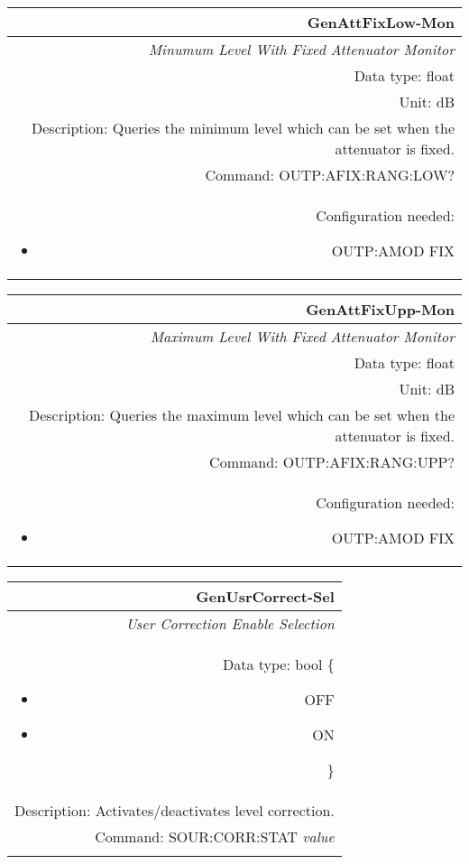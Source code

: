 \documentclass[openany]{article}
\begin{document}
		\begin{tabular}{N}
			\hline
			\bfseries GenAttFixLow-Mon \\ \hline
			\emph{Minumum Level With Fixed Attenuator Monitor} \\
			Data type: float \\
			Unit: dB \\
			Description: Queries the minimum level which can be set when the attenuator is fixed. \\
			Command: OUTP:AFIX:RANG:LOW? \\
			Configuration needed: \begin{itemize}[noitemsep]
				\small
				\item[] OUTP:AMOD FIX
			\end{itemize} \\

		\end{tabular}


		\begin{tabular}{N}
			\hline
			\bfseries GenAttFixUpp-Mon \\ \hline
			\emph{Maximum Level With Fixed Attenuator Monitor} \\
			Data type: float \\
			Unit: dB \\
			Description: Queries the maximum level which can be set when the attenuator is fixed. \\
			Command: OUTP:AFIX:RANG:UPP? \\
			Configuration needed: \begin{itemize}[noitemsep]
				\small
				\item[] OUTP:AMOD FIX
			\end{itemize} \\

		\end{tabular}


		\begin{tabular}{N}
			\hline
			\bfseries GenUsrCorrect-Sel \\ \hline
			\emph{User Correction Enable Selection} \\
			Data type: bool \{\begin{itemize}[noitemsep]
				\small
				\item[] OFF
				\item[] ON
			\end{itemize}\} \\
			Description: Activates/deactivates level correction. \\
			Command: SOUR:CORR:STAT \emph{value} \\
			\\ 

		\end{tabular}
\end{document}
